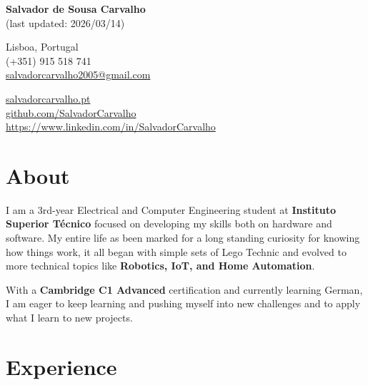 \documentclass[11pt,a4paper]{article}
\begin{document}
\begin{center}
    {\Huge \textbf{Salvador de Sousa Carvalho}} \\
    \vspace{2pt}
    {\footnotesize (last updated: 2026/03/14)}
\end{center}

\vspace{0.2cm}

\noindent
\begin{minipage}[t]{0.5\textwidth}
    Lisboa, Portugal \\
    (+351) 915 518 741 \\
    \href{mailto:salvadorcarvalho2005@gmail.com}{salvadorcarvalho2005@gmail.com}
\end{minipage}
\begin{minipage}[t]{0.5\textwidth}
    \raggedleft
    \href{https://salvadorcarvalho.pt}{salvadorcarvalho.pt} \\
    \href{https://github.com/CARVALHOCENT}{github.com/SalvadorCarvalho} \\
    \href{https://www.linkedin.com/in/salvadordesousacarvalho/}{https://www.linkedin.com/in/SalvadorCarvalho}
\end{minipage}

\section*{About}

I am a 3rd-year Electrical and Computer Engineering student at \textbf{Instituto Superior Técnico} focused on developing my skills both on hardware and software. My entire life as been marked for a long standing curiosity for knowing how things work, it all began with simple sets of Lego Technic and evolved to more technical topics like \textbf{Robotics, IoT, and Home Automation}. 

With a \textbf{Cambridge C1 Advanced} certification and currently learning German, I am eager to keep learning and pushing myself into new challenges and to apply what I learn to new projects.


\section*{Experience}
\end{document}
